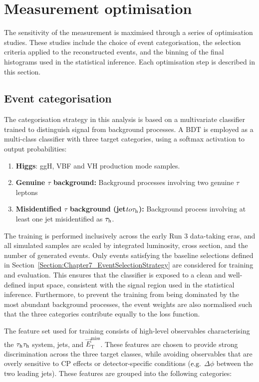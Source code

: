 \section{Measurement optimisation}
\label{Section:Chapter7_Optimisation}
The sensitivity of the measurement is maximised through a series of optimisation studies. These studies include the choice of event categorisation, the selection criteria applied to the reconstructed events, and the binning of the final histograms used in the statistical inference. Each optimisation step is described in this section.

\subsection{Event categorisation}
\label{Section:Chapter7_EventCategorisation}
The categorisation strategy in this analysis is based on a multivariate classifier trained to distinguish signal from background processes. 
A \ac{BDT} is employed as a multi-class classifier with three target categories, using a softmax activation to output probabilities: 

\begin{enumerate}[label=(\roman*)]
    \item \textbf{Higgs}: ggH, VBF and VH production mode samples.
    \item \textbf{Genuine $\tau$ background:} Background processes involving two genuine $\tau$ leptons
    \item \textbf{Misidentified $\tau$ background (jet$ to \tau_\mathrm{h}$):} Background process involving at least one jet misidentified as $\tau_\mathrm{h}$.
\end{enumerate}

The training is performed inclusively across the early Run 3 data-taking eras, and all simulated samples are scaled by integrated luminosity, cross section, and the number of generated events. Only events satisfying the baseline selections defined in Section~\ref{Section:Chapter7_EventSelectionStrategy} are considered for training and evaluation. This ensures that the classifier is exposed to a clean and well-defined input space, consistent with the signal region used in the statistical inference. Furthermore, to prevent the training from being dominated by the most abundant background processes, the event weights are also normalised such that the three categories contribute equally to the loss function.  

The feature set used for training consists of high-level observables characterising the $\tau_\mathrm{h}\tau_\mathrm{h}$ system, jets, and $\vec{E}^{\text{miss}}_\text{T}$. These features are chosen to provide strong discrimination across the three target classes, while avoiding observables that are overly sensitive to CP effects or detector-specific conditions ($\mbox{e.g.}$ $\Delta\phi$ between the two leading jets). These features are grouped into the following categories: 

